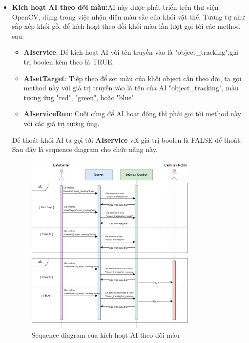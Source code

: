\begin{itemize}
    \item \textbf{Kich hoạt AI theo dõi màu:}AI này được phát triển trên thư viện OpenCV, dùng trong việc nhận diện màu sắc của khối vật thể. Tương tự như sắp xếp khối gỗ, để kích hoạt theo dỗi khối màu lần lượt gọi tới các method sau:
    \begin{itemize}
        \item \textbf{AIservice}: Để kích hoạt AI với tên truyền vào là "object\_tracking",giá trị boolen kèm theo là TRUE.
        \item \textbf{AIsetTarget}: Tiếp theo để set màu của khối object cần theo dõi, ta gọi method này với giá trị truyền vào là tên của AI "object\_tracking", màu tương ứng "red", "green", hoặc "blue".
        \item \textbf{AIserviceRun}: Cuối cùng để AI hoạt động thì phải gọi tới method này với các giá trị tương ứng.
    \end{itemize}
    Để thoát khỏi AI ta gọi tới \textbf{AIservice} với giá trị boolen là FALSE để thoát. Sau đây là sequence diagram cho chức năng này.
    \begin{figure}[!h]
        \centering
        \includegraphics[width=0.8\textwidth]{Images/Implementation/Control/object-tracking.jpg}
        \caption{Sequence diagram của kích hoạt AI theo dõi màu}
    \end{figure}

    \newpage
    

\end{itemize}
